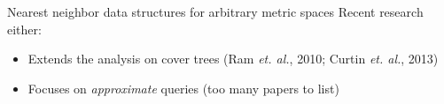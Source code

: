 \begin{frame}[fragile]{Nearest neighbor data structures for arbitrary metric spaces}
\vspace{0.05in}
Recent research either:
\begin{itemize}
\item Extends the analysis on cover trees {\footnotesize (Ram \emph{et. al.}, 2010; Curtin \emph{et. al.}, 2013)}
\item Focuses on \emph{approximate} queries (too many papers to list)
\end{itemize}


\end{frame}

